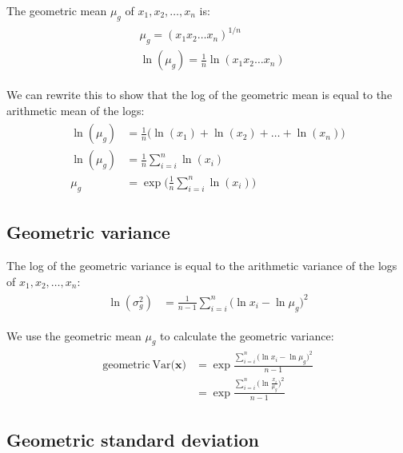 \documentclass[12pt, oneside, titlepage]{article}   	%
\begin{document}
The geometric mean $\mu_g$ of ${x_1, x_2, \dots, x_n}$ is:
%
\begin{align}
  \begin{split}
& \mu_g = ( x_1 x_2 \dots x_n )^{1/n} \\
& \ln ( \mu_g ) = \frac{1}{n}  \ln ( x_1 x_2 \dots x_n ) 
  \end{split}
\end{align}

We can rewrite this to show that the log of the geometric mean is equal to the arithmetic mean of the logs:
%
\begin{align}
  \begin{split}
\ln ( \mu_g )  & = \frac{1}{n}  \big( \ln ( x_1 ) +  \ln ( x_2  ) +  \dots + \ln ( x_n ) \big)
\\ \ln ( \mu_g ) & =  \frac{1}{n}  \sum\limits_{i=i}^n \ln ( x_i) 
\\  \mu_g   & =  \exp \Big( \frac{1}{n} \sum\limits_{i=i}^n \ln ( x_i)  \Big)
  \end{split}
\end{align}

\subsection*{Geometric variance}

The log of the geometric variance is equal to the arithmetic variance of the logs of ${x_1, x_2, \dots, x_n}$:
%
\begin{align}
  \begin{split}
\ln ( \sigma^2_g )  & =  \frac{ 1} { n - 1 } \sum\limits_{i=i}^n \big( \ln x_i - \ln \mu_g \big)^2  
  \end{split}
\end{align}

We use the geometric mean $\mu_g$ to calculate the geometric variance: 
%
\begin{align}
  \begin{split}
\mathrm{geometric\ Var(}\bm{x}\mathrm{)} & = \exp \frac{\sum\limits_{i=i}^n \big( \ln x_i - \ln \mu_g \big)^2 } { n - 1 }
\\ & =  \exp \frac{\sum\limits_{i=i}^n \big( \ln \frac{x_i}{\mu_g} \big)^2 } { n - 1 }
  \end{split}
\end{align}


\subsection*{Geometric standard deviation}
\end{document}
